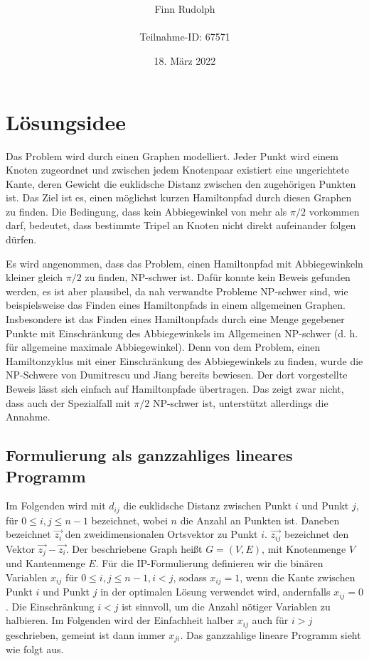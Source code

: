 \documentclass[a4paper, 10pt, ngerman]{article}
\title{\LARGE \textbf{\Aufgabe}}
\author{\large Finn Rudolph \\ \\ \large Teilnahme-ID: 67571}
\date{\large 18. März 2022}
\begin{document}
\begin{titlepage}
    \maketitle
    \tableofcontents
    \thispagestyle{empty}
\end{titlepage}

\newtheorem{theorem}{Satz}
\newtheorem{lemma}{Lemma}
\theoremstyle{definition}
\newtheorem{definition}{Definition}

\section{Lösungsidee}

Das Problem wird durch einen Graphen modelliert. Jeder Punkt wird einem Knoten zugeordnet und zwischen jedem Knotenpaar existiert eine ungerichtete Kante, deren Gewicht die euklidsche Distanz zwischen den zugehörigen Punkten ist. Das Ziel ist es, einen möglichst kurzen Hamiltonpfad durch diesen Graphen zu finden. Die Bedingung, dass kein Abbiegewinkel von mehr als $\pi / 2$ vorkommen darf, bedeutet, dass bestimmte Tripel an Knoten nicht direkt aufeinander folgen dürfen.

Es wird angenommen, dass das Problem, einen Hamiltonpfad mit Abbiegewinkeln kleiner gleich $\pi / 2$ zu finden, NP-schwer ist. Dafür konnte kein Beweis gefunden werden, es ist aber plausibel, da nah verwandte Probleme NP-schwer sind, wie beispielsweise das Finden eines Hamiltonpfads in einem allgemeinen Graphen. Insbesondere ist das Finden eines Hamiltonpfads durch eine Menge gegebener Punkte mit Einschränkung des Abbiegewinkels im Allgemeinen NP-schwer (d. h. für allgemeine maximale Abbiegewinkel). Denn von dem Problem, einen Hamiltonzyklus mit einer Einschränkung des  Abbiegewinkels zu finden, wurde die NP-Schwere von Dumitrescu und Jiang \cite{nphard} bereits bewiesen. Der dort vorgestellte Beweis lässt sich einfach auf Hamiltonpfade übertragen. Das zeigt zwar nicht, dass auch der Spezialfall mit $\pi / 2$ NP-schwer ist, unterstützt allerdings die Annahme.

\subsection{Formulierung als ganzzahliges lineares Programm}

Im Folgenden wird mit $d_{ij}$ die euklidsche Distanz zwischen Punkt $i$ und Punkt $j$, für $0 \le i, j \le n - 1$ bezeichnet, wobei $n$ die Anzahl an Punkten ist. Daneben bezeichnet $\vec{z_i}$ den zweidimensionalen Ortsvektor zu Punkt $i$. $\vec{z_{ij}}$ bezeichnet den Vektor $\vec{z_j} - \vec{z_i}$. Der beschriebene Graph heißt $G = (V, E)$, mit Knotenmenge $V$ und Kantenmenge $E$. Für die IP-Formulierung definieren wir die binären Variablen $x_{ij}$ für $0 \le i, j \le n - 1, i < j$, sodass $x_{ij} = 1$, wenn die Kante zwischen Punkt $i$ und Punkt $j$ in der optimalen Lösung verwendet wird, andernfalls $x_{ij} = 0$. Die Einschränkung $i < j$ ist sinnvoll, um die Anzahl nötiger Variablen zu halbieren. Im Folgenden wird der Einfachheit halber $x_{ij}$ auch für $i > j$ geschrieben, gemeint ist dann immer $x_{ji}$. Das ganzzahlige lineare Programm sieht wie folgt aus.
\end{document}
